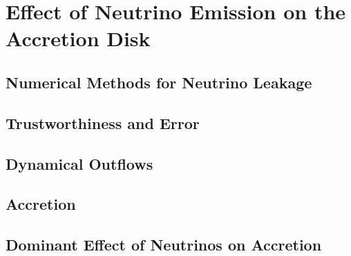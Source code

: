 \chapter{Effect of Neutrino Emission on the Accretion Disk}
\label{chap:leakage}

\section{Numerical Methods for Neutrino Leakage}

\section{Trustworthiness and Error}

\section{Dynamical Outflows}

\section{Accretion}

\section{Dominant Effect of Neutrinos on Accretion}
